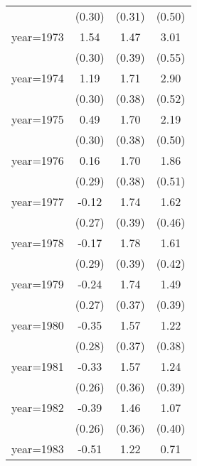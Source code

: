 \begin{sidewaystable}[htbp]
\begin{tabular}{l*{3}{c}}
                &   (0.30)         &   (0.31)         &   (0.50)         \\
\addlinespace
year=1973       &     1.54\sym{***}&     1.47\sym{***}&     3.01\sym{***}\\
                &   (0.30)         &   (0.39)         &   (0.55)         \\
\addlinespace
year=1974       &     1.19\sym{***}&     1.71\sym{***}&     2.90\sym{***}\\
                &   (0.30)         &   (0.38)         &   (0.52)         \\
\addlinespace
year=1975       &     0.49         &     1.70\sym{***}&     2.19\sym{***}\\
                &   (0.30)         &   (0.38)         &   (0.50)         \\
\addlinespace
year=1976       &     0.16         &     1.70\sym{***}&     1.86\sym{***}\\
                &   (0.29)         &   (0.38)         &   (0.51)         \\
\addlinespace
year=1977       &    -0.12         &     1.74\sym{***}&     1.62\sym{***}\\
                &   (0.27)         &   (0.39)         &   (0.46)         \\
\addlinespace
year=1978       &    -0.17         &     1.78\sym{***}&     1.61\sym{***}\\
                &   (0.29)         &   (0.39)         &   (0.42)         \\
\addlinespace
year=1979       &    -0.24         &     1.74\sym{***}&     1.49\sym{***}\\
                &   (0.27)         &   (0.37)         &   (0.39)         \\
\addlinespace
year=1980       &    -0.35         &     1.57\sym{***}&     1.22\sym{***}\\
                &   (0.28)         &   (0.37)         &   (0.38)         \\
\addlinespace
year=1981       &    -0.33         &     1.57\sym{***}&     1.24\sym{***}\\
                &   (0.26)         &   (0.36)         &   (0.39)         \\
\addlinespace
year=1982       &    -0.39         &     1.46\sym{***}&     1.07\sym{**} \\
                &   (0.26)         &   (0.36)         &   (0.40)         \\
\addlinespace
year=1983       &    -0.51\sym{**} &     1.22\sym{***}&     0.71\sym{*}  \\

\end{tabular}
\end{sidewaystable}

